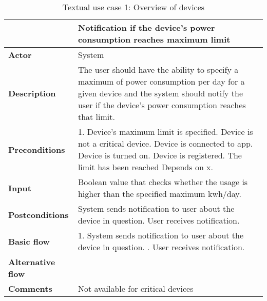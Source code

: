 \begin{table}[H]
\begin{tabular}{|l|p{12cm}|}
\hline
&\textbf{Notification if the device’s power consumption reaches maximum limit}
\\\hline
\textbf{Actor} &System
\\\hline
\textbf{Description}&
The user should have the ability to specify a maximum of power consumption per day for a given device and the system should notify the user if the device’s power consumption reaches that limit.\\\hline
\textbf{Preconditions}&
1. Device’s maximum limit is specified\newline
2. Device is not a critical device\newline
3. Device is connected to app\newline
4. Device is turned on\newline
5. Device is registered\newline
6. The limit has been reached\newline
Depends on x.\\\hline
\textbf{Input}&
Boolean value that checks whether the usage is higher than the specified maximum kwh/day.
\\\hline
\textbf{Postconditions}& 
System sends notification to user about the device in question. User receives notification.
\\\hline
\textbf{Basic flow}&
1. System sends notification to user about the device in question. \newline
2. User receives notification.\newline
\\\hline
\textbf{Alternative flow}&\\\hline
\textbf{Comments}& Not available for critical devices\\\hline
\end{tabular}
\caption{Textual use case 1: Overview of devices}
\end{table}

